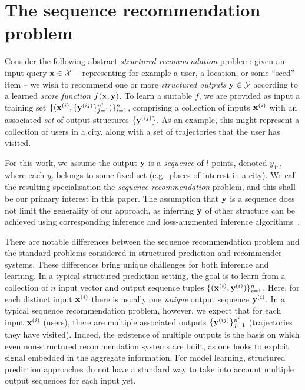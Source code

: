 \section{The sequence recommendation problem}
\label{sec:recseq}

Consider the following abstract
\emph{structured recommendation} problem:
given an input query $\mathbf{x} \in \mathcal{X}$ -- representing for example a user, a location, or some ``seed'' item --
we wish to recommend one or more \emph{structured outputs} $\mathbf{y} \in \mathcal{Y}$ according to a learned \emph{score function} $f(\mathbf{x},\mathbf{y})$.
To learn a suitable $f$,
we are provided as input a training set
$\{ ( \mathbf{x}^{({i})}, \{ \mathbf{y}^{({ij})} \}_{j=1}^{n^i} ) \}_{i=1}^{n}$,
comprising a collection of inputs $\mathbf{x}^{({i})}$ with an associated \emph{set} of output structures $\{ \mathbf{y}^{({ij})} \}$.
As an example, this might represent a collection of users in a city, along with a set of trajectories that the user has visited.

For this work, we assume the output $\mathbf{y}$ is a \emph{sequence} of $l$ points, denoted $y_{1:l}$
where each $y_i$ belongs to some fixed set (e.g.\ places of interest in a city).
We call the resulting specialisation the \emph{sequence recommendation} problem,
and this shall be our primary interest in this paper.
The assumption that $\mathbf{y}$ is a sequence does not limit the generality of our approach,
as inferring $\mathbf{y}$ of other structure can be achieved using corresponding inference and loss-augmented inference algorithms~\cite{joachims2009predicting}.  %

There are notable differences between the sequence recommendation problem and %
the standard problems considered in structured prediction and recommender systems.
These differences bring unique challenges for both inference and learning.
In a typical structured prediction setting, the goal is to learn from a collection of $n$
input vector and output sequence tuples %
$\{ (\mathbf{x}^{({i})}, \mathbf{y}^{({i})}) \}_{i = 1}^n$. Here,
for each distinct input $\mathbf{x}^{({i})}$ there is usually one \emph{unique} output sequence $\mathbf{y}^{({i})}$.
In a typical sequence recommendation problem, however, we expect that %
for each input $\mathbf{x}^{({i})}$ (\eg users),
there %
are multiple associated outputs %
$\{ \mathbf{y}^{({ij})} \}_{j=1}^{n^i}$ (\eg trajectories they have visited).
Indeed, the existence of multiple outputs is the basis on which even non-structured recommendation systems are built, as one looks to exploit signal embedded in the aggregate information.
For model learning, structured prediction approaches do not have a standard way to take into account multiple output sequences %
for each input %
yet.

